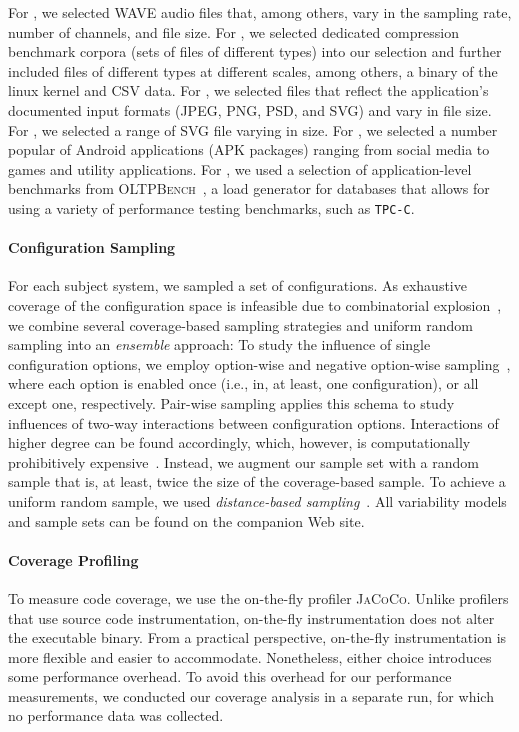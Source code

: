 {\color{purple}For \jumper, we selected WAVE audio files that, among others, vary in the sampling rate, number of channels, and file size. For \kanzi, we selected dedicated compression benchmark corpora (sets of files of different types) into our selection and further included files of different types at different scales, among others, a binary of the linux kernel and CSV data. For \dconvert, we selected files that reflect the application’s documented input formats (JPEG, PNG, PSD, and SVG) and vary in file size. For \batik, we selected a range of SVG file varying in size. For \jadx, we selected a number popular of Android applications (APK packages) ranging from social media to games and utility applications. For \htwo, we used a selection of application-level benchmarks from \textsc{OLTPBench}~\cite{difallah_oltp_2013}, a load generator for databases that allows for using a variety of performance testing benchmarks, such as \texttt{TPC-C}.}

\paragraph{Configuration Sampling}\label{sec:sampling}
For each subject system, we sampled a set of configurations. As exhaustive coverage of the configuration space is infeasible due to combinatorial explosion~\cite{henardCombining2015}, we combine several coverage-based sampling strategies and uniform random sampling into an \emph{ensemble} approach: 
To study the influence of single configuration options, we employ option-wise and negative option-wise sampling~\cite{siegmundPerformanceinfluenceModelsHighly2015}, where each option is enabled once (i.e., in, at least, one configuration), or all except one, respectively. Pair-wise sampling applies this schema to study influences of two-way interactions between configuration options. Interactions of higher degree can be found accordingly, which, however, is computationally prohibitively expensive~\cite{henardCombining2015}. Instead, we augment our sample set with a random sample that is, at least, twice the size of the coverage-based sample. To achieve a uniform random sample, we used \emph{distance-based sampling}~\cite{kaltenecker_distance-based_2019}. All variability models and sample sets can be found on the companion Web site.
	
\paragraph{Coverage Profiling}\label{sec:profiling}
To measure code coverage, we use the on-the-fly profiler \textsc{JaCoCo}. Unlike profilers that use source code instrumentation, on-the-fly instrumentation does not alter the executable binary. From a practical perspective, on-the-fly instrumentation is more flexible and easier to accommodate. Nonetheless, either choice introduces some performance overhead. To avoid this overhead for our performance measurements, we conducted our coverage analysis in a separate run, for which no performance data was collected. 	
	
